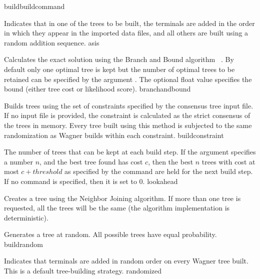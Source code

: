 \begin{command}{build}{buildcommand}
\begin{arguments}
            {Indicates that in one of the trees to be built, the terminals are
            added in the order in which they appear in the imported data files,
            and all others are built using a random addition sequence.}
            {asis}

            {Calculates the exact solution using the Branch and Bound algorithm
            ~\cite{hendy1982}. By default only one optimal tree is kept but
            the number of optimal trees to be retained can be specified by the
            argument . The optional float value specifies the
            bound (either tree cost or likelihood score).}
            {branchandbound} 

            {Builds trees using the set of constraints specified by the consensus
            tree input file. If no input file is provided, the constraint is calculated as
            the strict consensus of the trees in memory. Every tree built
            using this method is subjected to the same randomization as Wagner
            builds within each constraint.}
            {buildconstraint}

            {The number of trees that can be kept at each build step. If the
             argument 
            specifies a number $n$, and the best tree found has cost $c$, then the best $n$
            trees with cost at most $c + threshold$ as specified by
            the  command are held for the
            next build step. If no  command is specified,
            then it is set to $0$.}
            {lookahead}

            {Creates a tree using the Neighbor Joining algorithm. If more than
            one tree is requested, all the trees will be the same (the algorithm
            implementation is deterministic).}{}

            {Generates a tree at random. All possible trees have equal probability.}
            {buildrandom}

            {Indicates that terminals are added in random order on every Wagner tree built. 
            This is a default tree-building strategy.}
            {randomized}


\end{arguments}
\end{command}
